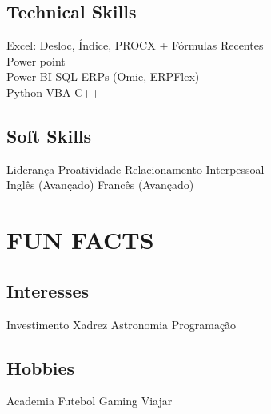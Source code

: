 \documentclass[]{deedy-resume-openfont}
\begin{document}
\begin{minipage}[t]{0.46\textwidth}
\subsection{Technical Skills}
Excel: Desloc, Índice, PROCX + Fórmulas Recentes \\ Power point \\
Power BI \textbullet{} SQL \textbullet{} ERPs (Omie, ERPFlex) \\
Python \textbullet{} VBA \textbullet{} C++ 
\sectionsep
\subsection{Soft Skills}
Liderança \textbullet{} Proatividade \textbullet{} Relacionamento Interpessoal \\Inglês (Avançado) \textbullet{} Francês (Avançado)
\sectionsep


\section{FUN FACTS}
\subsection{Interesses}
Investimento \textbullet{} Xadrez \textbullet{} Astronomia \textbullet{} Programação
\sectionsep
\subsection{Hobbies}
Academia \textbullet{} Futebol \textbullet{} Gaming \textbullet{} Viajar 
\sectionsep

\end{minipage} 
\end{document}
